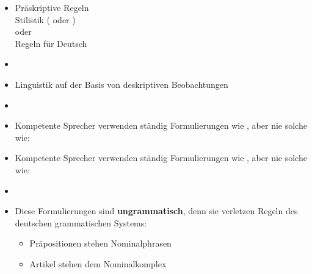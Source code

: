 \begin{frame}

\begin{itemize}
	\item Präskriptive Regeln \\
	\ras Stilistik ( oder )\\
	oder\\
	\ras Regeln für  Deutsch
	\item[]
	
	\item Linguistik \ras auf der Basis von deskriptiven Beobachtungen
	\item[]
	\item Kompetente Sprecher verwenden ständig Formulierungen wie , aber nie solche wie:
	
	\z
	
	\z
	
	\z
	
\end{itemize}

\end{frame}


\begin{frame}

\begin{itemize}
	\item Kompetente Sprecher verwenden ständig Formulierungen wie , aber nie solche wie:

	\z
	
	\z
	
	\z
	
	\item[]
	
	\item Diese Formulierungen sind \textbf{ungrammatisch}, denn sie verletzen Regeln des deutschen grammatischen Systems:
	\begin{itemize}
		\item Präpositionen stehen  Nominalphrasen
		\item Artikel stehen  dem Nominalkomplex
	\end{itemize}	 
\end{itemize}

\end{frame}

